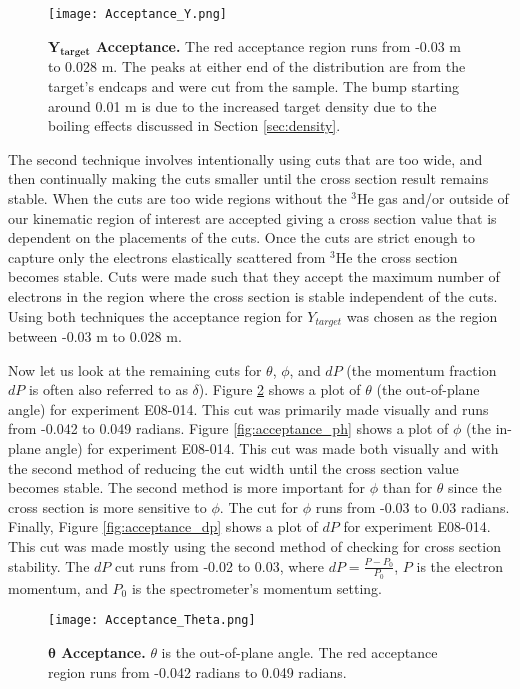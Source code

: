 \begin{figure}[!ht]
\begin{center}
\texttt{[image: Acceptance\_Y.png]}
\end{center}
\caption[$Y_{target}$ Acceptance]{
{\bf{$\boldsymbol{Y_{target}}$ Acceptance.}} The red acceptance region runs from -0.03 m to 0.028 m. The peaks at either end of the distribution are from the target's endcaps and were cut from the sample. The bump starting around 0.01 m is due to the increased target density due to the boiling effects discussed in Section \ref{sec:density}.}
\label{fig:acceptance_y}
\end{figure}

The second technique involves intentionally using cuts that are too wide, and then continually making the cuts smaller until the cross section result remains stable. When the cuts are too wide regions without the $^3$He gas and/or outside of our kinematic region of interest are accepted giving a cross section value that is dependent on the placements of the cuts. Once the cuts are strict enough to capture only the electrons elastically scattered from $^3$He the cross section becomes stable. Cuts were made such that they accept the maximum number of electrons in the region where the cross section is stable independent of the cuts. Using both techniques the acceptance region for $Y_{target}$ was chosen as the region between -0.03 m to 0.028 m.

Now let us look at the remaining cuts for $\theta$, $\phi$, and $dP$ (the momentum fraction $dP$ is often also referred to as $\delta$). Figure \ref{fig:acceptance_th} shows a plot of $\theta$ (the out-of-plane angle) for experiment E08-014. This cut was primarily made visually and runs from -0.042 to 0.049 radians. Figure \ref{fig:acceptance_ph} shows a plot of $\phi$ (the in-plane angle) for experiment E08-014. This cut was made both visually and with the second method of reducing the cut width until the cross section value becomes stable. The second method is more important for $\phi$ than for $\theta$ since the cross section is more sensitive to $\phi$. The cut for $\phi$ runs from -0.03 to 0.03 radians. Finally, Figure \ref{fig:acceptance_dp} shows a plot of $dP$ for experiment E08-014. This cut was made mostly using the second method of checking for cross section stability. The $dP$ cut runs from -0.02 to 0.03, where $dP = \frac{P-P_0}{P_0}$, $P$ is the electron momentum, and $P_0$ is the spectrometer's momentum setting.

\begin{figure}[!ht]
\begin{center}
\texttt{[image: Acceptance\_Theta.png]}
\end{center}
\caption[$\theta$ Acceptance]{
{\bf{$\boldsymbol{\theta}$ Acceptance.}} $\theta$ is the out-of-plane angle. The red acceptance region runs from -0.042 radians to 0.049 radians.}
\label{fig:acceptance_th}
\end{figure}

